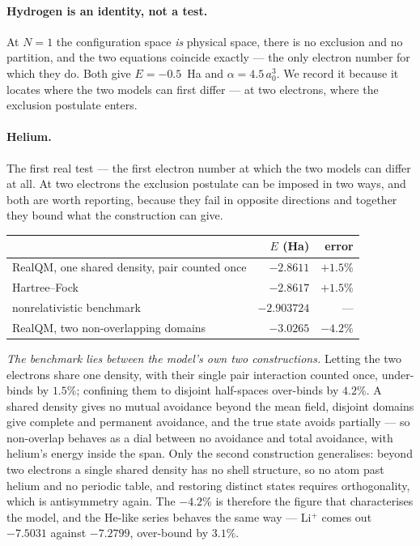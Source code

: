 \documentclass[11pt]{article}
\begin{document}
\paragraph{Hydrogen is an identity, not a test.} At $N=1$ the configuration space \emph{is}
physical space, there is no exclusion and no partition, and the two equations coincide exactly ---
the only electron number for which they do. Both give $E = -0.5$~Ha and
$\alpha = 4.5\,a_0^3$. We record it because it locates where the two models can first differ ---
at two electrons, where the exclusion postulate enters.

\paragraph{Helium.} The first real test --- the first electron number at which the two models can
differ at all. At two electrons the exclusion postulate can be imposed in two ways, and both are
worth reporting, because they fail in opposite directions and together they bound what the
construction can give.

\begin{center}
\begin{tabular}{lrr}
\toprule
 & $E$ (Ha) & error \\
\midrule
RealQM, one shared density, pair counted once & $-2.8611$ & $+1.5\%$ \\
Hartree--Fock                                 & $-2.8617$ & $+1.5\%$ \\
nonrelativistic benchmark~\cite{Pekeris1958}  & $-2.903724$ & --- \\
RealQM, two non-overlapping domains           & $-3.0265$ & $-4.2\%$ \\
\bottomrule
\end{tabular}
\end{center}

\emph{The benchmark lies between the model's own two constructions.} Letting the two electrons
share one density, with their single pair interaction counted once, under-binds by $1.5\%$;
confining them to disjoint half-spaces over-binds by $4.2\%$. A shared density gives no mutual
avoidance beyond the mean field, disjoint domains give complete and permanent avoidance, and the
true state avoids partially --- so non-overlap behaves as a dial between no avoidance and total
avoidance, with helium's energy inside the span. Only the second construction generalises: beyond
two electrons a single shared density has no shell structure, so no atom past helium and no
periodic table, and restoring distinct states requires orthogonality, which is antisymmetry again.
The $-4.2\%$ is therefore the figure that characterises the model, and the He-like series behaves
the same way --- Li$^+$ comes out $-7.5031$ against $-7.2799$, over-bound by $3.1\%$.
\end{document}
